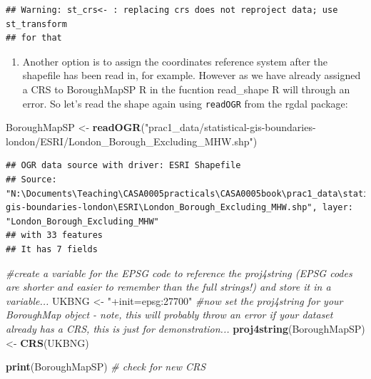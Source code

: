 \documentclass[]{book}
\newenvironment{Shaded}{\begin{snugshade}}{\end{snugshade}}
\newcommand{\CommentTok}[1]{\textcolor[rgb]{0.56,0.35,0.01}{\textit{#1}}}
\newcommand{\KeywordTok}[1]{\textcolor[rgb]{0.13,0.29,0.53}{\textbf{#1}}}
\newcommand{\NormalTok}[1]{#1}
\newcommand{\StringTok}[1]{\textcolor[rgb]{0.31,0.60,0.02}{#1}}
\providecommand{\tightlist}{%
  \setlength{\itemsep}{0pt}\setlength{\parskip}{0pt}}
\begin{document}
\begin{verbatim}
## Warning: st_crs<- : replacing crs does not reproject data; use st_transform
## for that
\end{verbatim}

\begin{enumerate}
\def\labelenumi{\arabic{enumi}.}
\setcounter{enumi}{26}
\tightlist
\item
  Another option is to assign the coordinates reference system after the shapefile has been read in, for example. However as we have already assigned a CRS to BoroughMapSP R in the fucntion read\_shape R will through an error. So let's read the shape again using \texttt{readOGR} from the rgdal package:
\end{enumerate}

\begin{Shaded}
\begin{Highlighting}[]
\NormalTok{BoroughMapSP <-}\StringTok{ }\KeywordTok{readOGR}\NormalTok{(}\StringTok{"prac1_data/statistical-gis-boundaries-london/ESRI/London_Borough_Excluding_MHW.shp"}\NormalTok{)}
\end{Highlighting}
\end{Shaded}

\begin{verbatim}
## OGR data source with driver: ESRI Shapefile 
## Source: "N:\Documents\Teaching\CASA0005practicals\CASA0005book\prac1_data\statistical-gis-boundaries-london\ESRI\London_Borough_Excluding_MHW.shp", layer: "London_Borough_Excluding_MHW"
## with 33 features
## It has 7 fields
\end{verbatim}

\begin{Shaded}
\begin{Highlighting}[]
\CommentTok{#create a variable for the EPSG code to reference the proj4string (EPSG codes are shorter and easier to remember than the full strings!) and store it in a variable...}
\NormalTok{UKBNG <-}\StringTok{ "+init=epsg:27700"}
\CommentTok{#now set the proj4string for your BoroughMap object - note, this will probably throw an error if your dataset already has a CRS, this is just for demonstration...}
\KeywordTok{proj4string}\NormalTok{(BoroughMapSP) <-}\StringTok{ }\KeywordTok{CRS}\NormalTok{(UKBNG)}
\end{Highlighting}
\end{Shaded}

\begin{Shaded}
\begin{Highlighting}[]
\KeywordTok{print}\NormalTok{(BoroughMapSP) }\CommentTok{# check for new CRS}
\end{Highlighting}
\end{Shaded}
\end{document}
